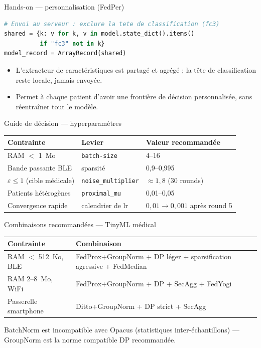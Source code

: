 \documentclass[aspectratio=169,11pt]{beamer}
\begin{document}
\begin{frame}[fragile]{Hands-on --- personnalisation (FedPer)}
\begin{lstlisting}[language=Python]
# Envoi au serveur : exclure la tete de classification (fc3)
shared = {k: v for k, v in model.state_dict().items()
          if "fc3" not in k}
model_record = ArrayRecord(shared)
\end{lstlisting}
  \begin{itemize}
    \small
    \item L'extracteur de caractéristiques est partagé et agrégé ; la tête
      de classification reste locale, jamais envoyée.
    \item Permet à chaque patient d'avoir une frontière de décision
      personnalisée, sans réentraîner tout le modèle.
  \end{itemize}
\end{frame}

\begin{frame}{Guide de décision --- hyperparamètres}
  \centering
  \footnotesize
  \begin{tabular}{lll}
    \toprule
    Contrainte & Levier & Valeur recommandée \\
    \midrule
    RAM $<$ 1~Mo & \texttt{batch-size} & 4--16 \\
    Bande passante BLE & sparsité & 0,9--0,995 \\
    $\varepsilon \le 1$ (cible médicale) & \texttt{noise\_multiplier} & $\approx 1{,}8$ (30 rounds) \\
    Patients hétérogènes & \texttt{proximal\_mu} & 0,01--0,05 \\
    Convergence rapide & calendrier de lr & $0{,}01 \to 0{,}001$ après round 5 \\
    \bottomrule
  \end{tabular}
\end{frame}

\begin{frame}{Combinaisons recommandées --- TinyML médical}
  \centering
  \footnotesize
  \begin{tabular}{lp{6cm}}
    \toprule
    Contrainte & Combinaison \\
    \midrule
    RAM $<$ 512~Ko, BLE & FedProx+GroupNorm + DP léger + sparsification
      agressive + FedMedian \\
    RAM 2--8~Mo, WiFi & FedProx+GroupNorm + DP + SecAgg + FedYogi \\
    Passerelle smartphone & Ditto+GroupNorm + DP strict + SecAgg \\
    \bottomrule
  \end{tabular}
  \vspace{1em}

  \footnotesize BatchNorm est incompatible avec Opacus (statistiques
  inter-échantillons) --- GroupNorm est la norme compatible DP recommandée.
\end{frame}
\end{document}
